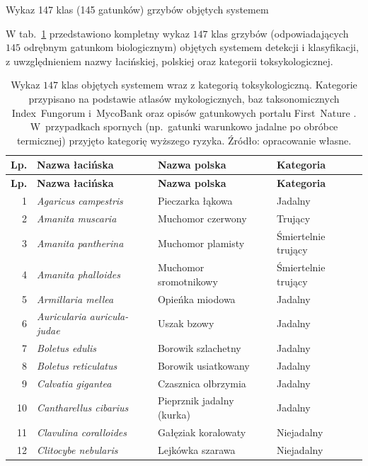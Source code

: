 \begin{easyappendix}{Wykaz 147 klas (145 gatunków) grzybów objętych systemem}

W tab.~\ref{tab:zal2_gatunki} przedstawiono kompletny wykaz $147$ klas grzybów (odpowiadających $145$ odrębnym gatunkom biologicznym) objętych systemem detekcji i klasyfikacji, z uwzględnieniem nazwy łacińskiej, polskiej oraz kategorii toksykologicznej.

\begin{longtable}{|r|l|l|l|}
\caption{Wykaz $147$ klas objętych systemem wraz z kategorią toksykologiczną. Kategorie przypisano na podstawie atlasów mykologicznych, baz taksonomicznych Index~Fungorum \cite{indexfungorum} i~MycoBank \cite{mycobank} oraz opisów gatunkowych portalu First~Nature \cite{firstnature}. W~przypadkach spornych (np.\ gatunki warunkowo jadalne po obróbce termicznej) przyjęto kategorię wyższego ryzyka. Źródło: opracowanie własne.\label{tab:zal2_gatunki}} \\
\hline
\textbf{Lp.} & \textbf{Nazwa łacińska} & \textbf{Nazwa polska} & \textbf{Kategoria} \\
\hline
\endfirsthead
\hline
\textbf{Lp.} & \textbf{Nazwa łacińska} & \textbf{Nazwa polska} & \textbf{Kategoria} \\
\hline
\endhead
1 & \textit{Agaricus campestris} & Pieczarka łąkowa & Jadalny \\
2 & \textit{Amanita muscaria} & Muchomor czerwony & Trujący \\
3 & \textit{Amanita pantherina} & Muchomor plamisty & Śmiertelnie trujący \\
4 & \textit{Amanita phalloides} & Muchomor sromotnikowy & Śmiertelnie trujący \\
5 & \textit{Armillaria mellea} & Opieńka miodowa & Jadalny \\
6 & \textit{Auricularia auricula-judae} & Uszak bzowy & Jadalny \\
7 & \textit{Boletus edulis} & Borowik szlachetny & Jadalny \\
8 & \textit{Boletus reticulatus} & Borowik usiatkowany & Jadalny \\
9 & \textit{Calvatia gigantea} & Czasznica olbrzymia & Jadalny \\
10 & \textit{Cantharellus cibarius} & Pieprznik jadalny (kurka) & Jadalny \\
11 & \textit{Clavulina coralloides} & Gałęziak koralowaty & Niejadalny\\
12 & \textit{Clitocybe nebularis} & Lejkówka szarawa & Niejadalny \\

\end{longtable}
\end{easyappendix}
